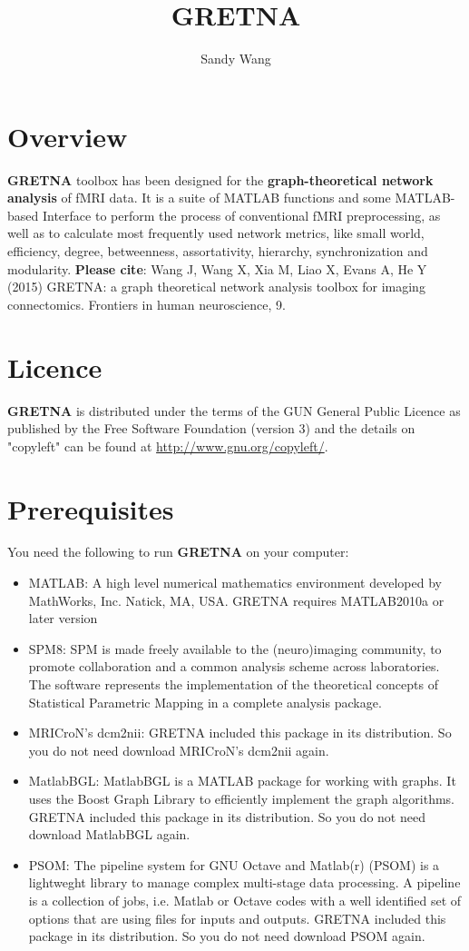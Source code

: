 \documentclass[11pt]{article}
\title{GRETNA}
\author{Sandy Wang}
\begin{document}
	\maketitle
	\tableofcontents
	\section{Overview}
		\textbf{GRETNA} toolbox has been designed for the \textbf{graph-theoretical network analysis} of fMRI data. 
		It is a suite of MATLAB functions and some MATLAB-based Interface to perform the process of conventional fMRI preprocessing,
		as well as to calculate most frequently used network metrics, 
		like small world, efficiency, degree, betweenness, assortativity, hierarchy, synchronization and modularity.
        \textbf{Please cite}: Wang J, Wang X, Xia M, Liao X, Evans A, He Y (2015)
        GRETNA: a graph theoretical network analysis toolbox for imaging 
        connectomics. Frontiers in human neuroscience, 9.
	\section{Licence}
		\textbf{GRETNA} is distributed under the terms of the GUN General Public Licence as published by the Free Software Foundation (version 3) 
		and the details on "copyleft" can be found at \url{http://www.gnu.org/copyleft/}.
	\section{Prerequisites}
		You need the following to run \textbf{GRETNA} on your computer:
		\begin{itemize}
			\item MATLAB: A high level numerical mathematics environment developed by MathWorks, Inc. Natick, MA, USA.
				GRETNA requires MATLAB2010a or later version
			\item SPM8: SPM is made freely available to the (neuro)imaging community, 
				to promote collaboration and a common analysis scheme across laboratories. 
				The software represents the implementation of the theoretical concepts of Statistical Parametric Mapping in a complete analysis package.
			\item MRICroN's dcm2nii: 
				GRETNA included this package in its distribution. So you do not need download MRICroN's dcm2nii again.
			\item MatlabBGL: MatlabBGL is a MATLAB package for working with graphs. 
				It uses the Boost Graph Library to efficiently implement the graph algorithms.
				GRETNA included this package in its distribution. So you do not need download MatlabBGL again.
			\item PSOM: The pipeline system for GNU Octave and Matlab(r) (PSOM) is a lightweght library to manage complex multi-stage data processing.
				A pipeline is a collection of jobs, i.e. Matlab or Octave codes with a well identified set of options that are using files for inputs and outputs.
				GRETNA included this package in its distribution. So you do not need download PSOM again.
		\end{itemize}
\end{document}
